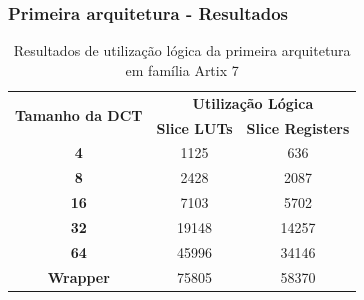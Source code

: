 \documentclass{beamer}
\begin{document}
\begin{frame}
       \frametitle{Primeira arquitetura - Resultados}
              \begin{table}[h]
                     \centering
                     \caption{Resultados de utilização lógica da primeira arquitetura em família Artix 7}
                     \begin{tabular}{ccc} \toprule
                            \multirow{2}{*}{\textbf{Tamanho da DCT}} &     \multicolumn{2}{c}{\textbf{Utilização Lógica}} \\
                            &      \textbf{Slice LUTs} &      \textbf{Slice Registers} \\ \toprule
                            \textbf{4} &    1125  &       636  \\ \hline
                            \textbf{8} &    2428  &       2087  \\ \hline
                            \textbf{16} &   7103  &      5702  \\ \hline
                            \textbf{32} &   19148  &     14257  \\ \hline
                            \textbf{64} &   45996  &    34146  \\ \bottomrule        
                            \textbf{Wrapper} & 75805  & 58370  \\
                            \bottomrule
                     \end{tabular}    
                     \label{tab:v1results}
              \end{table}
\end{frame}

\end{document}
